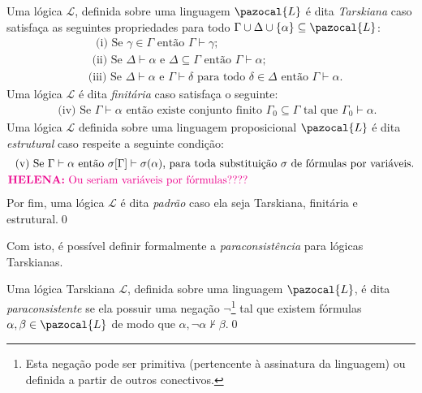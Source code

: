 \begin{definicao}
    \label{def:padrao}
    Uma lógica $\mathcal{L}$, definida sobre uma linguagem $\pazocal{L}$ é dita \textit{Tarskiana} caso satisfaça as seguintes propriedades para todo $\Gamma \cup \Delta \cup \{\alpha\} \subseteq \pazocal{L}$:
    \begin{align*}
         & \text{~~(i) Se } \gamma \in \Gamma \text{ então } \Gamma \vdash \gamma;                                                                       \\
         & \text{~(ii) Se } \Delta \vdash \alpha \text{ e } \Delta \subseteq \Gamma \text{ então } \Gamma \vdash \alpha;                                 \\
         & \text{(iii) Se } \Delta \vdash \alpha \text{ e } \Gamma \vdash \delta \text{ para todo } \delta \in \Delta \text{ então } \Gamma \vdash \alpha.
    \end{align*}
    Uma lógica $\mathcal{L}$ é dita \textit{finitária} caso satisfaça o seguinte:
    \begin{align*}
         & \text{~(iv) Se } \Gamma \vdash \alpha \text{ então existe conjunto finito } \Gamma_{0} \subseteq \Gamma \text{ tal que } \Gamma_{0} \vdash \alpha.
    \end{align*}
    Uma lógica $\mathcal{L}$ definida sobre uma linguagem proposicional $\pazocal{L}$ é dita \textit{estrutural} caso respeite a seguinte condição:
    \begin{align*}
         & \text{~~(v) Se } \Gamma \vdash \alpha \text{ então } \sigma [\Gamma] \vdash \sigma(\alpha) \text{, para toda substituição } \sigma \text{ de fórmulas por variáveis.}\\
        & \text{\textcolor{magenta}{\textbf{HELENA:} Ou seriam variáveis por fórmulas????}}
    \end{align*}
    Por fim, uma lógica $\mathcal{L}$ é dita \textit{padrão} caso ela seja Tarskiana, finitária e estrutural.\qed
\end{definicao}
Com isto, é possível definir formalmente a \textit{paraconsistência} para lógicas Tarskianas.

\begin{definicao}
    \label{def:tarskiana_paracons}
    Uma lógica Tarskiana $\mathcal{L}$, definida sobre uma linguagem $\pazocal{L}$, é dita \textit{paraconsistente} se ela possuir uma negação $\neg$\footnote{Esta negação pode ser primitiva (pertencente à assinatura da linguagem) ou definida a partir de outros conectivos.} tal que existem fórmulas $\alpha, \beta \in \pazocal{L}$ de modo que $\alpha, \neg \alpha \nvdash \beta$.\qed{}
\end{definicao}

